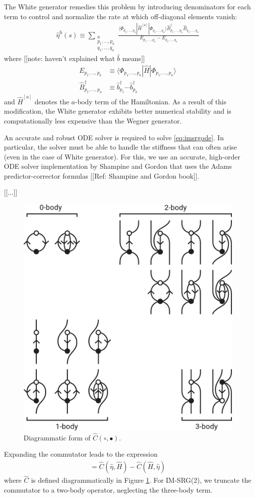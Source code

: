 \documentclass[amsmath, amssymb, aps, floatfix, nofootinbib, preprintnumbers,showpacs, superscriptaddress, twocolumn]{revtex4-1}
\begin{document}
The White generator remedies this problem by introducing denominators for each
term to control and normalize the rate at which off-diagonal elements vanish:
\begin{align*}
  \hat \eta^{\text{h}}(s) \equiv
  \sum_{\substack{a \\ p_1, \ldots, p_a \\ q_1, \ldots, q_a}}
  \frac{
  \langle \Phi_{p_1, \ldots, p_a} | \hat H^{[a]} | \Phi_{q_1, \ldots, q_a} \rangle
  \hat B_{p_1, \ldots, p_a}^\dagger \hat B_{q_1, \ldots, q_a}^{}
  }{E_{p_1, \ldots, p_a} - E_{q_1, \ldots, q_a}}
\end{align*}
where [[note: haven't explained what $\hat b$ means]]
\begin{align*}
  E_{p_1, \ldots, p_a} &\equiv
  \langle \Phi_{p_1, \ldots, p_a} | \hat H | \Phi_{p_1, \ldots, p_a} \rangle \\
  \hat B_{p_1, \ldots, p_a}^\dagger &\equiv
  \hat b_{p_1}^\dagger \cdots \hat b_{p_a}^\dagger
\end{align*}
and $\hat H^{[a]}$ denotes the $a$-body term of the Hamiltonian.  As a result
of this modification, the White generator exhibits better numerical stability
and is computationally less expensive than the Wegner generator.

An accurate and robust ODE solver is required to solve \eqref{eq:imsrgode}.
In particular, the solver must be able to handle the stiffness that can often
arise (even in the case of White generator).  For this, we use an accurate,
high-order ODE solver implementation by Shampine and Gordon that uses the
Adams predictor-corrector formulas [[Ref: Shampine and Gordon book]].

[[...]]

\begin{figure}
\includegraphics[width=.48\textwidth]{fig-diagrams-imsrg}
\caption{Diagrammatic form of $\hat C(\circ, \bullet)$.}
\label{fig:diagrams-imsrg}
\end{figure}
Expanding the commutator leads to the expression
\begin{align*}
  [\hat \eta, \hat H] = \hat C(\hat \eta, \hat H) - \hat C(\hat H, \hat \eta)
\end{align*}
where $\hat C$ is defined diagrammatically in Figure \ref{fig:diagrams-imsrg}.
For IM-SRG(2), we truncate the commutator to a two-body operator, neglecting
the three-body term.
\end{document}

